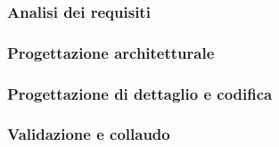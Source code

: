 \subsubsection{Analisi dei requisiti}



\subsubsection{Progettazione architetturale}



\subsubsection{Progettazione di dettaglio e codifica}



\subsubsection{Validazione e collaudo}



